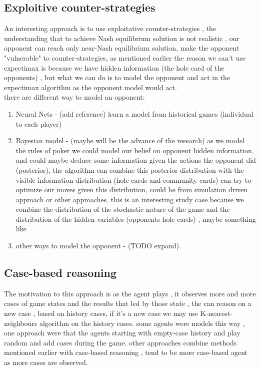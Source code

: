 \documentclass{article}
\begin{document}
\subsection{Exploitive counter-strategies}
An interesting approach is to use exploitative counter-strategies , the understanding that to achieve Nash equilibrium solution is not realistic , our opponent can reach only near-Nash equilibrium solution, make the opponent "vulnerable" to counter-strategies, as mentioned earlier the reason we can't use expectimax is because we have hidden information (the hole card of the opponents) , but what we can do is to model the opponent and act in the expectimax algorithm as the opponent model would act.\\
there are different way to model an opponent: \\
\begin{enumerate}
\item Neural Nets - (add reference) learn a model from historical games (individual to each player) \\
\item Bayesian model - (maybe will be the advance of the research) as we model the rules of poker we could model our belief on opponent hidden information, and could maybe deduce some information given the actions the opponent did (posterior), the algorithm can combine this posterior distribution with the visible information distribution (hole cards and community cards)  can try to optimize our moves given this distribution, could be from simulation driven approach or other approaches. this is an interesting study case because we combine the distribution of the stochastic nature of the game and the distribution of the hidden variables (opponents hole cards) , maybe something like \cite{Seaman2018ProbabilisticPF}\\
\item other ways to model the opponent - (TODO expand).
\end{enumerate}

\subsection{Case-based reasoning}
The motivation to this approach is as the agent plays , it observes more and more cases of game states and the results that led by those state , the can reason on a new case , based on history cases, if it's a new case we may use K-nearest-neighbours algorithm on the history cases. 
some agents were models this way , one approach were that the agents starting with empty-case history and play random and add cases during the game. other approaches combine 
methods mentioned earlier with case-based reasoning , tend to be more case-based agent as more cases are observed. 
\end{document}
